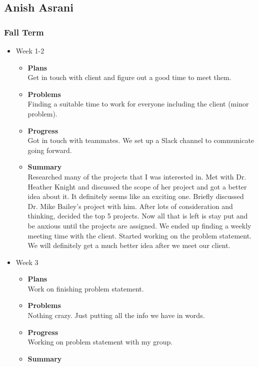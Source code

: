 	\pagebreak

	\subsection{Anish Asrani}
	\subsubsection{Fall Term}
	\begin{itemize}
		\item{Week 1-2}
			\begin{itemize}
				\item \textbf{Plans} \\
				Get in touch with client and figure out a good time to meet them.
				\item \textbf{Problems} \\
				Finding a suitable time to work for everyone including the client (minor problem).
				\item \textbf{Progress} \\
				Got in touch with teammates. We set up a Slack channel to communicate going forward. 
				\item \textbf{Summary} \\
				Researched many of the projects that I was interested in. Met with Dr. Heather Knight and discussed the scope of her project and got a better idea about it. It definitely seems like an exciting one. Briefly discussed Dr. Mike Bailey's project with him. After lots of consideration and thinking, decided the top 5 projects. Now all that is left is stay put and be anxious until the projects are assigned. 
				We ended up finding a weekly meeting time with the client. Started working on the problem statement.  We will definitely get a much better idea after we meet our client. 
			\end{itemize}
		\item{Week 3}	
			\begin{itemize}
				\item \textbf{Plans} \\
				Work on finishing problem statement.
				\item \textbf{Problems} \\
				Nothing crazy. Just putting all the info we have in words.
				\item \textbf{Progress} \\
				Working on problem statement with my group.
				\item \textbf{Summary} \\

\end{itemize}
\end{itemize}
